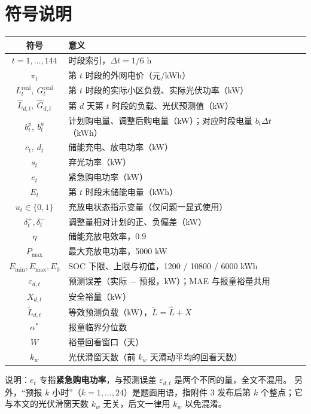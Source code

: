 \documentclass{cumcmthesis}
\begin{document}
\section{符号说明}
\begin{center}
\begin{tabular}{cl}
\hline
符号 & 意义 \\
\hline
$t=1,\dots,144$ & 时段索引，$\Delta t=1/6$ h \\
$\pi_t$ & 第 $t$ 时段的外网电价（元/kWh） \\
$L_t^{\mathrm{real}},\ G_t^{\mathrm{real}}$ & 第 $t$ 时段的实际小区负载、实际光伏功率（kW） \\
$\hat L_{d,t},\ \hat G_{d,t}$ & 第 $d$ 天第 $t$ 时段的负载、光伏预测值（kW） \\
$b_t^{p},\ b_t^{a}$ & 计划购电量、调整后购电量（kW）；对应时段电量 $b_t\Delta t$（kWh） \\
$c_t,\ d_t$ & 储能充电、放电功率（kW） \\
$s_t$ & 弃光功率（kW） \\
$e_t$ & 紧急购电功率（kW） \\
$E_t$ & 第 $t$ 时段末储能电量（kWh） \\
$u_t\in\{0,1\}$ & 充放电状态指示变量（仅问题一显式使用） \\
$\delta_t^{+},\delta_t^{-}$ & 调整量相对计划的正、负偏差（kW） \\
$\eta$ & 储能充放电效率，$0.9$ \\
$P_{\max}$ & 最大充放电功率，5000 kW \\
$E_{\min},E_{\max},E_0$ & SOC 下限、上限与初值，1200 / 10800 / 6000 kWh \\
$\varepsilon_{d,t}$ & 预测误差（实际 $-$ 预报，kW）；MAE 与报童裕量共用 \\
$X_{d,t}$ & 安全裕量（kW） \\
$\tilde L_{d,t}$ & 等效预测负载（kW），$\tilde L=\hat L+X$ \\
$\alpha^{*}$ & 报童临界分位数 \\
$W$ & 裕量回看窗口（天） \\
$k_w$ & 光伏滑窗天数（前 $k_w$ 天滑动平均的回看天数） \\
\hline
\end{tabular}
\end{center}

\noindent 说明：$e_t$ 专指\textbf{紧急购电功率}，与预测误差 $\varepsilon_{d,t}$ 是两个不同的量，全文不混用。
另外，“预报 $k$ 小时”（$k=1,\dots,24$）是题面用语，指附件 3 发布后第 $k$ 个整点；它与本文的光伏滑窗天数 $k_w$ 无关，后文一律用 $k_w$ 以免混淆。
\end{document}
